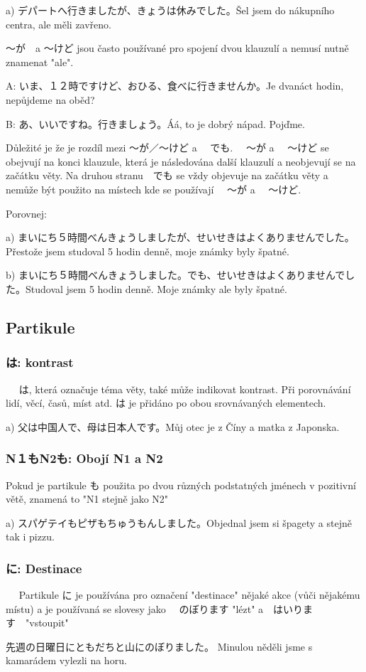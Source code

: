 a) デパートへ行きましたが、きょうは休みでした。Šel jsem do nákupního centra, ale měli zavřeno.

〜が　a 〜けど jsou často používané pro spojení dvou klauzulí a nemusí nutně znamenat "ale".

A: いま、１２時ですけど、おひる、食べに行きませんか。Je dvanáct hodin, nepůjdeme na oběd?

B: あ、いいですね。行きましょう。Áá, to je dobrý nápad. Pojďme. 

Důležité je že je rozdíl mezi  〜が／〜けど a  　でも. 　〜が a 　〜けど se obejvují na konci klauzule, která je následována další klauzulí a neobjevují se na začátku věty. Na druhou stranu　でも se vždy objevuje na začátku věty a nemůže být použito na místech kde se používají 　〜が a 　〜けど.

Porovnej: 

a) まいにち５時間べんきょうしましたが、せいせきはよくありませんでした。Přestože jsem studoval 5 hodin denně, moje známky byly špatné.

b) まいにち５時間べんきょうしました。でも、せいせきはよくありませんでした。Studoval jsem 5 hodin denně. Moje známky ale byly špatné.

\subsection{Partikule}
\subsubsection{は: kontrast}
　
は, která označuje téma věty, také může indikovat kontrast. Při porovnávání lidí, věcí, časů, míst atd. は je přidáno po obou srovnávaných elementech.

a) 父は中国人で、母は日本人です。Můj otec je z Číny a matka z Japonska.

\subsubsection{N１もN2も: Obojí N1 a N2　}
Pokud je partikule も použita po dvou různých podstatných jménech v pozitivní větě, znamená to "N1 stejně jako N2" 

a) スパゲテイもピザもちゅうもんしました。Objednal jsem si špagety a stejně tak i pizzu.


\subsubsection{に: Destinace}　
Partikule に je používána pro označení "destinace" nějaké akce (vůči nějakému místu) a je používaná se slovesy jako 　のぼります "lézt"  a　はいります　"vstoupit"

先週の日曜日にともだちと山にのぼりました。 Minulou něděli jsme s kamarádem vylezli na horu.